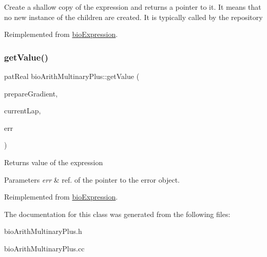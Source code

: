 Create a shallow copy of the expression and returns a pointer to it. It means that no new instance of the children are created. It is typically called by the repository 

Reimplemented from \hyperlink{classbio_expression_a442534762693b92baaf33928979a1bf8}{bio\+Expression}.

\mbox{\label{classbio_arith_multinary_plus_a90c1c66054e19f52a4424664f7c09d7a}} 
\subsubsection{\texorpdfstring{get\+Value()}{getValue()}}
{\footnotesize\ttfamily pat\+Real bio\+Arith\+Multinary\+Plus\+::get\+Value (\begin{DoxyParamCaption}\item[{pat\+Boolean}]{prepare\+Gradient,  }\item[{pat\+U\+Long}]{current\+Lap,  }\item[{pat\+Error $\ast$\&}]{err }\end{DoxyParamCaption})\hspace{0.3cm}{\ttfamily [virtual]}}

\begin{DoxyReturn}{Returns}
value of the expression 
\end{DoxyReturn}

\begin{DoxyParams}{Parameters}
{\em err} & ref. of the pointer to the error object. \\
\hline
\end{DoxyParams}


Reimplemented from \hyperlink{classbio_expression_af58662a5d4d456f15bc4f2c9bd4f8a5b}{bio\+Expression}.



The documentation for this class was generated from the following files\+:\begin{DoxyCompactItemize}
\item 
bio\+Arith\+Multinary\+Plus.\+h\item 
bio\+Arith\+Multinary\+Plus.\+cc\end{DoxyCompactItemize}
